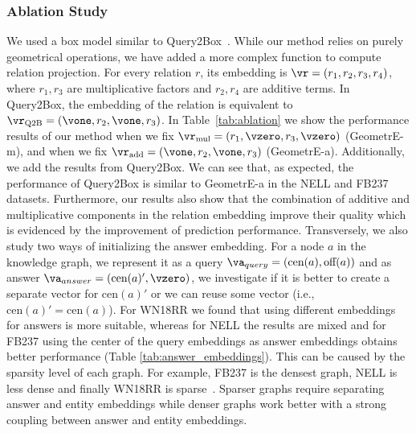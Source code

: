 \documentclass[runningheads]{llncs}
\newcommand{\cen}[1]{\mbox{cen}({#1})}
\newcommand{\off}[1]{\mbox{off}({#1})}
\newcommand{\method}{GeometrE}
\renewcommand{\paragraph}[1]{\subsubsection{#1}}
\begin{document}
  
\paragraph{Ablation Study}

We used a box model similar to Query2Box~\cite{query2box}. While
our method relies on purely geometrical operations, we have added a
more complex function to compute relation projection. For every
relation $r$, its embedding is $\vr = (r_1,r_2,r_3,r_4)$, where
$r_1,r_3$ are multiplicative factors and $r_2,r_4$ are additive
terms. In Query2Box, the embedding of the relation is equivalent to
$\vr_{\mbox{\scriptsize Q2B}} = (\vone, r_2, \vone, r_3)$. In
Table~\ref{tab:ablation} we show the performance results of our method
when we fix $\vr_{\mbox{\scriptsize mul}}=(r_1, \vzero, r_3, \vzero)$
(\method{}-m), and when we fix
$\vr_{\mbox{\scriptsize add}} = (\vone, r_2, \vone, r_3)$
(\method{}-a). Additionally, we add the results from Query2Box. We can
see that, as expected, the performance of Query2Box is similar to
\method{}-a in the NELL and FB237 datasets. Furthermore, our results
also show that the combination of additive and multiplicative
components in the relation embedding improve their quality which is
evidenced by the improvement of prediction performance.
Transversely, we also study two ways of initializing the answer
embedding. For a node $a$ in the knowledge graph, we represent it as a
query $\va_{\scriptsize query}=(\cen{a},\off{a})$ and as answer
$\va_{\scriptsize answer} = (\cen{a}', \vzero)$, we investigate if it
is better to create a separate vector for $\cen{a}'$ or we can reuse
some vector (i.e., $\cen{a}' = \cen{a}$). For WN18RR we found that
using different embeddings for answers is more suitable, whereas for
NELL the results are mixed and for FB237 using the center of the query
embeddings as answer embeddings obtains better performance (Table
\ref{tab:answer_embeddings}). This can be caused by the sparsity level
of each graph. For example, FB237 is the densest graph, NELL is less
dense and finally WN18RR is sparse~\cite{lin-etal-2018-multi}. Sparser
graphs require separating answer and entity embeddings while denser
graphs work better with a strong coupling between answer and entity
embeddings.
\end{document}
